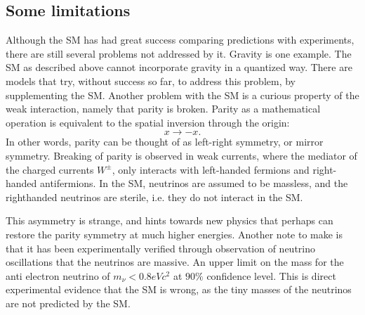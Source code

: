\subsection*{Some limitations}
Although the SM has had great success comparing predictions with experiments,
there are still several problems not addressed by it. Gravity is one example. The SM
as described above cannot incorporate gravity in a quantized way. There 
are models that try, without success so far, to address this problem, by supplementing the SM. 
Another problem with the SM is a curious property of the weak interaction, 
namely that parity is broken. Parity as a mathematical operation is equivalent to the spatial inversion 
through the origin\cite{Thomson:2013zua}:
\begin{equation}
    x \to -x.
\end{equation}
In other words, parity can be thought of as left-right symmetry, or mirror symmetry. Breaking of parity is observed
in weak currents, where the mediator of the charged currents $W^{\pm}$, only interacts with 
left-handed fermions and right-handed antifermions. In the SM, neutrinos are assumed to be massless, and the righthanded 
neutrinos are sterile, i.e. they do not interact in the SM. \par 
This asymmetry is strange, and hints towards new physics that perhaps can restore the parity symmetry at much higher energies. 
Another note to make is that it has been experimentally verified through observation of neutrino oscillations that the neutrinos are massive.
An upper limit on the mass for the anti electron neutrino of $m_{\nu} < 0.8eVc^2$ at $90\%$ confidence level\cite{Katrin_neutrinos}.
This is direct experimental evidence that the SM is wrong, as the tiny masses of the neutrinos are not predicted by the SM. 








